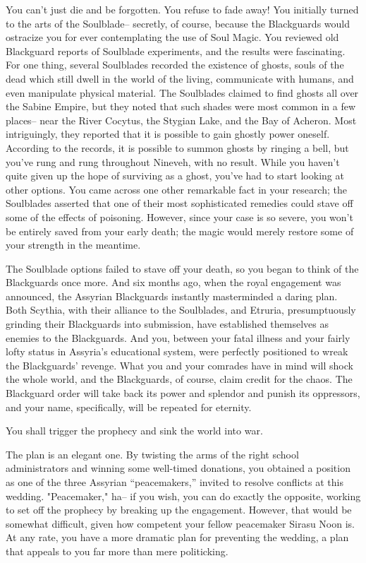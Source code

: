 \documentclass[char]{Kos}
\begin{document}
You can't just die and be forgotten. You refuse to fade away! You initially turned to the arts of the Soulblade-- secretly, of course, because the Blackguards would ostracize you for ever contemplating the use of Soul Magic. You reviewed old Blackguard reports of Soulblade experiments, and the results were fascinating. For one thing, several Soulblades recorded the existence of ghosts, souls of the dead which still dwell in the world of the living, communicate with humans, and even manipulate physical material. The Soulblades claimed to find ghosts all over the Sabine Empire, but they noted that such shades were most common in a few places-- near the River Cocytus, the Stygian Lake, and the Bay of Acheron. Most intriguingly, they reported that it is possible to gain ghostly power oneself. According to the records, it is possible to summon ghosts by ringing a bell, but you've rung and rung throughout Nineveh, with no result. While you haven't quite given up the hope of surviving as a ghost, you've had to start looking at other options. You came across one other remarkable fact in your research; the Soulblades asserted that one of their most sophisticated remedies could stave off some of the effects of poisoning. However, since your case is so severe, you won't be entirely saved from your early death; the magic would merely restore some of your strength in the meantime.

The Soulblade options failed to stave off your death, so you began to think of the Blackguards once more. And six months ago, when the royal engagement was announced, the Assyrian Blackguards instantly masterminded a daring plan. Both Scythia, with their alliance to the Soulblades, and Etruria, presumptuously grinding their Blackguards into submission, have established themselves as enemies to the Blackguards. And you, between your fatal illness and your fairly lofty status in Assyria's educational system, were perfectly positioned to wreak the Blackguards' revenge. What you and your comrades have in mind will shock the whole world, and the Blackguards, of course, claim credit for the chaos. The Blackguard order will take back its power and splendor and punish its oppressors, and your name, specifically, will be repeated for eternity. 

You shall trigger the prophecy and sink the world into war.

The plan is an elegant one. By twisting the arms of the right school administrators and winning some well-timed donations, you obtained a position as one of the three Assyrian ``peacemakers,'' invited to resolve conflicts at this wedding. "Peacemaker," ha-- if you wish, you can do exactly the opposite, working to set off the prophecy by breaking up the engagement. However, that would be somewhat difficult, given how competent your fellow peacemaker Sirasu Noon is. At any rate, you have a more dramatic plan for preventing the wedding, a plan that appeals to you far more than mere politicking.
\end{document}
